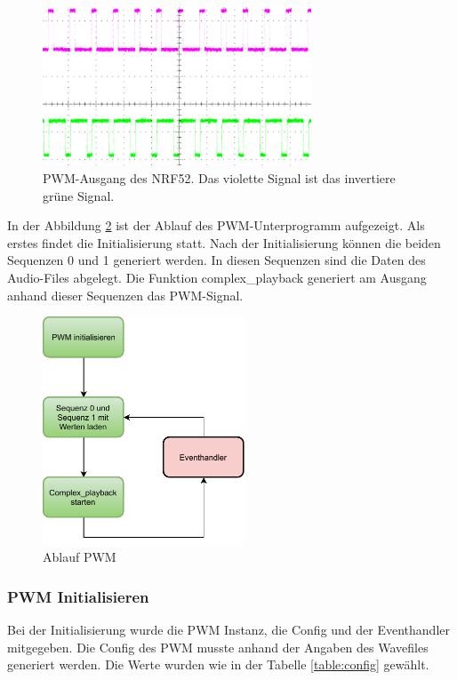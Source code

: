 \begin{figure}[H]
	\begin{center}
		\includegraphics[width=80mm]{data/PWM_Signal_500Hz_Mono}
		\caption[PWM-Ausgang des NRF52]{PWM-Ausgang des NRF52. Das violette Signal ist das invertiere grüne Signal.} %
		\label{fig:pwm_ausgang}
	\end{center}
\end{figure}

In der Abbildung \ref{fig:pwm_ablauf} ist der Ablauf des PWM-Unterprogramm aufgezeigt. Als erstes findet die Initialisierung statt. Nach der Initialisierung können die beiden Sequenzen 0 und 1 generiert werden. In diesen Sequenzen sind die Daten des Audio-Files abgelegt. Die Funktion complex\_playback generiert am Ausgang anhand dieser Sequenzen das PWM-Signal.

\begin{figure}[H]
	\begin{center}
		\includegraphics[width=60mm]{data/pwm_ablauf}
		\caption[Ablauf PWM]{Ablauf PWM} %
		\label{fig:pwm_ablauf}
	\end{center}
\end{figure}

\subsubsection*{PWM Initialisieren}\label{sec:PWM initialisieren}
Bei der Initialisierung wurde die PWM Instanz, die Config und der Eventhandler mitgegeben.  Die Config des PWM musste anhand der Angaben des Wavefiles generiert werden. Die Werte wurden wie in der Tabelle \ref{table:config} gewählt.


